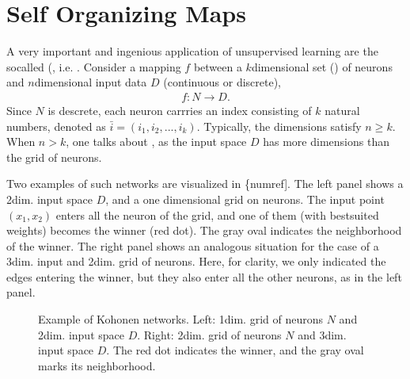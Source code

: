 \documentclass[letterpaper,10pt,english]{jupyterBook}
\let\sphinxpxdimen\pdfpxdimen\else\newdimen\sphinxpxdimen
\begin{document}
\chapter{Self Organizing Maps}
\label{\detokenize{docs/som:self-organizing-maps}}\label{\detokenize{docs/som::doc}}
\sphinxAtStartPar
A very important and ingenious application of unsupervised learning are the so\sphinxhyphen{}called  (, i.e. . Consider a mapping \(f\) between a  \(k\)\sphinxhyphen{}dimensional set () of neurons and \(n\)\sphinxhyphen{}dimensional input data \(D\) (continuous or discrete),
\begin{equation*}
\begin{split}
f: N \to D.
\end{split}
\end{equation*}
\sphinxAtStartPar
Since \(N\) is descrete, each neuron carrries an index consisting of \(k\) natural numbers, denoted as \(\bar {i} = (i_1, i_2, ..., i_k)\). Typically, the dimensions satisfy \(n \ge k\). When \(n > k\), one talks about , as the input space \(D\) has more dimensions than the grid of neurons.

\sphinxAtStartPar
Two examples of such networks are visualized in \{numref{]}. The left panel shows a 2\sphinxhyphen{}dim. input space \(D\), and a one dimensional grid on neurons. The input point \((x_1,x_2)\) enters all the neuron of the grid, and one of them (with best\sphinxhyphen{}suited weights) becomes the winner (red dot). The gray oval indicates the neighborhood of the winner. The right panel shows an analogous situation for the case of a 3\sphinxhyphen{}dim. input and 2\sphinxhyphen{}dim. grid of neurons. Here, for clarity, we only indicated the edges entering the winner, but they also enter all the other neurons, as in the left panel.

\begin{figure}[htbp]
\centering
\capstart

\noindent\sphinxincludegraphics[width=500\sphinxpxdimen]{{koha}.png}
\caption{Example of Kohonen networks. Left: 1\sphinxhyphen{}dim. grid of neurons \(N\) and 2\sphinxhyphen{}dim. input space \(D\). Right: 2\sphinxhyphen{}dim. grid of neurons \(N\) and 3\sphinxhyphen{}dim. input space \(D\). The red dot indicates the winner, and the gray oval marks its neighborhood.}\label{\detokenize{docs/som:koh-fig}}\end{figure}
\end{document}

